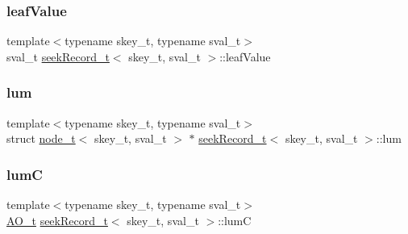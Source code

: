 \mbox{\label{structseekRecord__t_a0dcdcf40b44d819c423485031c192da0}} 
\subsubsection{\texorpdfstring{leaf\+Value}{leafValue}}
{\footnotesize\ttfamily template$<$typename skey\+\_\+t, typename sval\+\_\+t$>$ \\
sval\+\_\+t \hyperlink{structseekRecord__t}{seek\+Record\+\_\+t}$<$ skey\+\_\+t, sval\+\_\+t $>$\+::leaf\+Value}

\mbox{\label{structseekRecord__t_ae1253c37644bed48ae50a7fbc10c8604}} 
\subsubsection{\texorpdfstring{lum}{lum}}
{\footnotesize\ttfamily template$<$typename skey\+\_\+t, typename sval\+\_\+t$>$ \\
struct \hyperlink{structnode__t}{node\+\_\+t}$<$ skey\+\_\+t, sval\+\_\+t $>$ $\ast$ \hyperlink{structseekRecord__t}{seek\+Record\+\_\+t}$<$ skey\+\_\+t, sval\+\_\+t $>$\+::lum}

\mbox{\label{structseekRecord__t_a1849a6fcb4ef24205344d35670ba56a3}} 
\subsubsection{\texorpdfstring{lumC}{lumC}}
{\footnotesize\ttfamily template$<$typename skey\+\_\+t, typename sval\+\_\+t$>$ \\
\hyperlink{atomic__ops_8h_a5225fef4d9eee821e82382cd269160dd}{A\+O\+\_\+t} \hyperlink{structseekRecord__t}{seek\+Record\+\_\+t}$<$ skey\+\_\+t, sval\+\_\+t $>$\+::lumC}

\mbox{\label{structseekRecord__t_a7ff4a49b56e97553713f4ffa9ebb9762}} 
